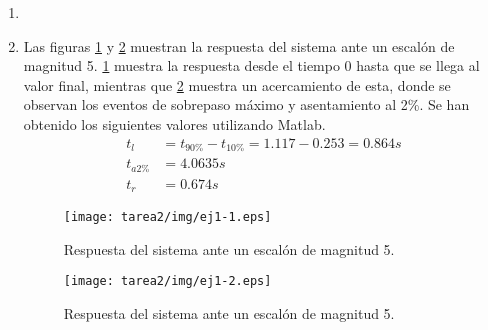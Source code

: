 \begin{ejercicio}
\begin{enumerate}
\begin{enumerate}
      \item %
      \newpage
      \item %
      Las figuras \ref{fig1} y \ref{fig2} muestran la respuesta del sistema ante un escalón de magnitud 5. \ref{fig1} muestra la respuesta desde el tiempo 0 hasta que se llega al valor final, mientras que \ref{fig2} muestra un acercamiento de esta, donde se observan los eventos de sobrepaso máximo y asentamiento al 2\%.
      Se han obtenido los siguientes valores utilizando Matlab.
      \begin{align*}
        t_l &= t_{90\%} - t_{10\%} = 1.117 - 0.253 = 0.864s
        \\
        t_{a2\%} &= 4.0635s
        \\
        t_r &= 0.674s
      \end{align*}
      \begin{figure}[H]
        \centering
        \texttt{[image: tarea2/img/ej1-1.eps]}
        \caption{Respuesta del sistema ante un escalón de magnitud 5.}
        \label{fig1}
      \end{figure}
      \begin{figure}[H]
        \centering
        \texttt{[image: tarea2/img/ej1-2.eps]}
        \caption{Respuesta del sistema ante un escalón de magnitud 5.}
        \label{fig2}
      \end{figure}
    \end{enumerate}
  \end{enumerate}

\end{ejercicio}